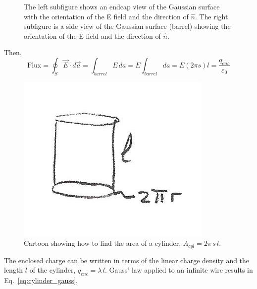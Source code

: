 \documentclass[12pt]{article}
\begin{document}
\begin{flushleft}
\begin{figure}[h]
\centering
\vspace{-.5in}
\hspace{.1in}
\caption{The left subfigure shows an endcap view of the Gaussian surface with the orientation of the E field and the direction of $\hat{n}$.  The right subfigure is a side view of the Gaussian surface (barrel) showing the orientation of the E field and the direction of $\hat{n}$.}
\label{fig:directions}
\end{figure}

Then, 
\begin{equation*}
\mbox{Flux} = \oint_{S} \vec{E} \cdot d\vec{a} = \int_{barrel} E \, da = E\int_{barrel} da = E (2\pi s)l = \frac{q_{enc}}{\varepsilon_{0}}
\end{equation*}

\begin{figure}[h]
\centering
\includegraphics*[trim=0cm .5cm 0cm 0cm, clip=true, width=0.25\columnwidth]{cylinder.png}
\caption{\small Cartoon showing how to find the area of a cylinder, $A_{cyl}=2\pi \,s \,l$.}
\label{fig:cylinder}
\end{figure}
   
The enclosed charge can be written in terms of the linear charge density and the length $l$ of the cylinder, $q_{enc}=\lambda \, l$.  Gauss' law applied to an infinite wire results in  Eq.~\ref{eq:cylinder_gauss},


\end{flushleft}
\end{document}
